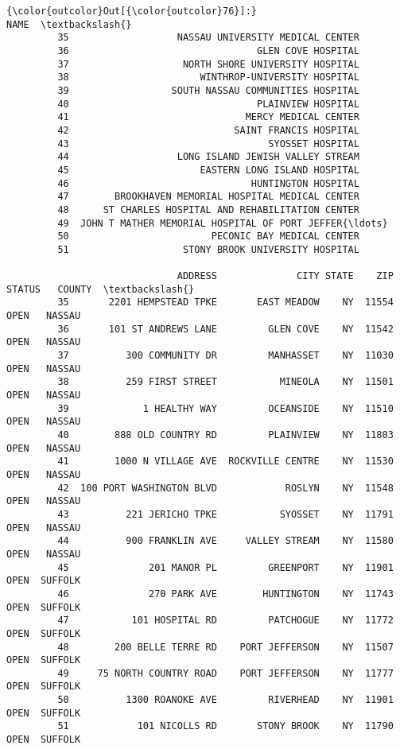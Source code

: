 \documentclass[11pt]{article}
\begin{document}
\begin{Verbatim}[commandchars=\\\{\}]
{\color{outcolor}Out[{\color{outcolor}76}]:}                                                  NAME  \textbackslash{}
         35                   NASSAU UNIVERSITY MEDICAL CENTER   
         36                                 GLEN COVE HOSPITAL   
         37                    NORTH SHORE UNIVERSITY HOSPITAL   
         38                       WINTHROP-UNIVERSITY HOSPITAL   
         39                  SOUTH NASSAU COMMUNITIES HOSPITAL   
         40                                 PLAINVIEW HOSPITAL   
         41                               MERCY MEDICAL CENTER   
         42                             SAINT FRANCIS HOSPITAL   
         43                                   SYOSSET HOSPITAL   
         44                   LONG ISLAND JEWISH VALLEY STREAM   
         45                       EASTERN LONG ISLAND HOSPITAL   
         46                                HUNTINGTON HOSPITAL   
         47        BROOKHAVEN MEMORIAL HOSPITAL MEDICAL CENTER   
         48      ST CHARLES HOSPITAL AND REHABILITATION CENTER   
         49  JOHN T MATHER MEMORIAL HOSPITAL OF PORT JEFFER{\ldots}   
         50                         PECONIC BAY MEDICAL CENTER   
         51                    STONY BROOK UNIVERSITY HOSPITAL   
         
                              ADDRESS              CITY STATE    ZIP STATUS   COUNTY  \textbackslash{}
         35       2201 HEMPSTEAD TPKE       EAST MEADOW    NY  11554   OPEN   NASSAU   
         36       101 ST ANDREWS LANE         GLEN COVE    NY  11542   OPEN   NASSAU   
         37          300 COMMUNITY DR         MANHASSET    NY  11030   OPEN   NASSAU   
         38          259 FIRST STREET           MINEOLA    NY  11501   OPEN   NASSAU   
         39             1 HEALTHY WAY         OCEANSIDE    NY  11510   OPEN   NASSAU   
         40        888 OLD COUNTRY RD         PLAINVIEW    NY  11803   OPEN   NASSAU   
         41        1000 N VILLAGE AVE  ROCKVILLE CENTRE    NY  11530   OPEN   NASSAU   
         42  100 PORT WASHINGTON BLVD            ROSLYN    NY  11548   OPEN   NASSAU   
         43          221 JERICHO TPKE           SYOSSET    NY  11791   OPEN   NASSAU   
         44          900 FRANKLIN AVE     VALLEY STREAM    NY  11580   OPEN   NASSAU   
         45              201 MANOR PL         GREENPORT    NY  11901   OPEN  SUFFOLK   
         46              270 PARK AVE        HUNTINGTON    NY  11743   OPEN  SUFFOLK   
         47           101 HOSPITAL RD         PATCHOGUE    NY  11772   OPEN  SUFFOLK   
         48        200 BELLE TERRE RD    PORT JEFFERSON    NY  11507   OPEN  SUFFOLK   
         49     75 NORTH COUNTRY ROAD    PORT JEFFERSON    NY  11777   OPEN  SUFFOLK   
         50          1300 ROANOKE AVE         RIVERHEAD    NY  11901   OPEN  SUFFOLK   
         51            101 NICOLLS RD       STONY BROOK    NY  11790   OPEN  SUFFOLK   
         

\end{Verbatim}
\end{document}
